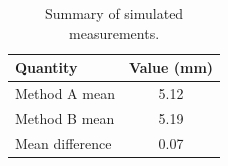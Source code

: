 \documentclass{article}
\begin{document}
\begin{table}[htbp]
  \centering
  \caption{Summary of simulated measurements.}
  \begin{tabular}{@{}lS[table-format=1.2]@{}}
    \toprule
    {Quantity} & {Value (mm)} \\
    \midrule
    Method A mean & 5.12 \\
    Method B mean & 5.19 \\
    Mean difference & 0.07 \\
    \bottomrule
  \end{tabular}
\end{table}
\end{document}

